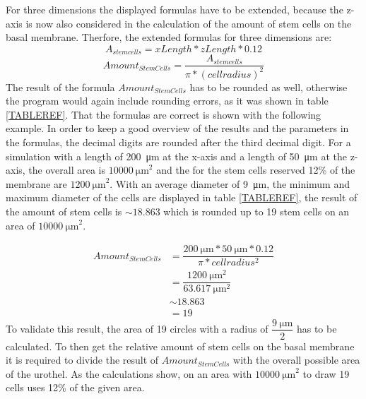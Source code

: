 For three dimensions the displayed formulas have to be extended, because the z-axis is now also considered in the calculation of the amount of stem cells on the basal membrane. Therfore, the extended formulas for three dimensions are:
\begin{equation}
A_{stem cells} = xLength * zLength * 0.12
\end{equation}
\begin{equation}
Amount_{StemCells} = \dfrac{A_{stem cells}}{\pi * (cell radius)^{2}} 
\end{equation}
The result of the formula $Amount_{StemCells}$ has to be rounded as well, otherwise the program would again include rounding errors, as it was shown in table \ref{TABLEREF}. That the formulas are correct is shown with the following example. In order to keep a good overview of the results and the parameters in the formulas, the decimal digits are rounded after the third decimal digit. \newline
For a simulation with a length of \SI{200}{\micro\metre} at the x-axis and a length of \SI{50}{\micro\metre} at the z-axis, the overall area is $\SI{10000}{\micro\metre}^{2}$ and the for the stem cells reserved 12\% of the membrane are $\SI{1200}{\micro\metre}^{2}$. With an average diameter of \SI{9}{\micro\metre}, the minimum and maximum diameter of the cells are displayed in table \ref{TABLEREF}, the result of the amount of stem cells is $\sim 18.863$ which is rounded up to 19 stem cells on an area of $\SI{10000}{\micro\metre}^{2}$.


\begin{equation}
\begin{split}
Amount_{StemCells} & = \dfrac{\SI{200}{\micro\metre} * \SI{50}{\micro\metre} * 0.12}{\pi * cell radius^{2}} \\
					& = \dfrac{\SI{1200}{\micro\metre^{2}}}{\SI{63.617}{\micro\metre^{2}}} \\
					& \sim 18.863 \\
					& = 19
\end{split}
\end{equation}
To validate this result, the area of 19 circles with a radius of $\dfrac{\SI{9}{\micro\metre}}{2}$ has to be calculated. To then get the relative amount of stem cells on the basal membrane it is required to divide the result of $Amount_{StemCells}$ with the overall possible area of the urothel. As the calculations show, on an area with $\SI{10000}{\micro\metre}^{2}$ to draw 19 cells uses 12\% of the given area.

